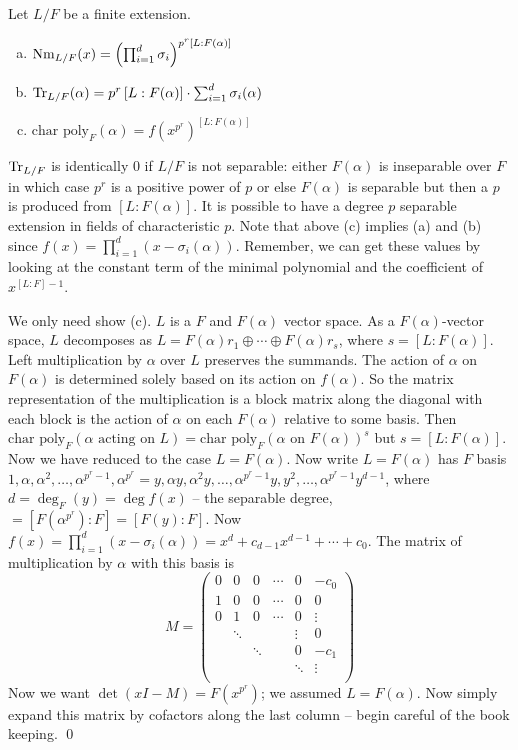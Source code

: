 \begin{thm} Let $L/F$ be a finite extension.
\begin{enumerate}[(a)]
\item $\text{Nm}_{L/F}(x)= \left(\prod_{i=1}^d \sigma_i \right)^{p^r  [L:F(\alpha)]}$
\item $\text{Tr}_{L/F}(\alpha)= p^r \,[L:F(\alpha)] \cdot \sum_{i=1}^d \sigma_i(\alpha)$ 
\item $\text{char poly}_F(\alpha)=f(x^{p^r})^{[L:F(\alpha)]}$
\end{enumerate}
\end{thm}

\begin{rem}
$\text{Tr}_{L/F}$ is identically 0 if $L/F$ is not separable: either $F(\alpha)$ is inseparable over $F$ in which case $p^r$ is a positive power of $p$ or else $F(\alpha)$ is separable but then a $p$ is produced from $[L:F(\alpha)]$. It is possible to have a degree $p$ separable extension in fields of characteristic $p$. Note that above (c) implies (a) and (b) since $f(x)=\prod_{i=1}^d (x-\sigma_i(\alpha))$. Remember, we can get these values by looking at the constant term of the minimal polynomial and the coefficient of $x^{[L:F]-1}$. 
\end{rem}

\pf We only need show (c). $L$ is a $F$ and $F(\alpha)$ vector space. As a $F(\alpha)$-vector space, $L$ decomposes as $L=F(\alpha)r_1 \oplus \cdots \oplus F(\alpha) r_s$, where $s=[L:F(\alpha)]$. Left multiplication by $\alpha$ over $L$ preserves the summands. The action of $\alpha$ on $F(\alpha)$ is determined solely based on its action on $f(\alpha)$. So the matrix representation of the multiplication is a block matrix along the diagonal with each block is the action of $\alpha$ on each $F(\alpha)$ relative to some basis. Then $\text{char poly}_F(\alpha \text{ acting on }L)=\text{char poly}_F(\alpha \text{ on }F(\alpha))^s$ but $s=[L:F(\alpha)]$. Now we have reduced to the case $L=F(\alpha)$. Now write $L=F(\alpha)$ has $F$ basis $1,\alpha,\alpha^2,\ldots,\alpha^{p^r-1},\alpha^{p^r}=y,\alpha y,\alpha^2y,\ldots,\alpha^{p^r-1}y,y^2,\ldots,\alpha^{p^r-1} y^{d-1}$, where $d=\deg_F(y)=\deg f(x)$ -- the separable degree, $=[F(\alpha^{p^r}):F]=[F(y):F]$. Now $f(x)=\prod_{i=1}^d (x-\sigma_i(\alpha))= x^d + c_{d-1} x^{d-1} + \cdots + c_0$. The matrix of multiplication by $\alpha$ with this basis is
	\[
	M=
	\begin{pmatrix}
	0 & 0 & 0 & \cdots & 0 & -c_0 \\
	1 & 0 & 0 & \cdots & 0 & 0 \\
	0 & 1 & 0 & \cdots & 0 & \vdots \\
	 &  \ddots &  &  & \vdots & 0 \\
	 &  & \ddots &  & 0 & -c_1 \\
	 &  &  &  & \ddots & \vdots \\
	\end{pmatrix}
	\] %
Now we want $\det(xI-M)=F(x^{p^r})$; we assumed $L=F(\alpha)$. Now simply expand this matrix by cofactors along the last column -- begin careful of the book keeping. \qed \\
